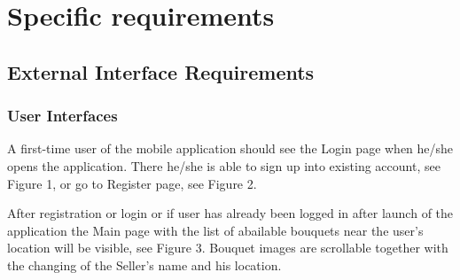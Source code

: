 \documentclass{scrreprt}
\begin{document}
\chapter{Specific requirements}
\section{External Interface Requirements}

\subsection{User Interfaces}
A first-time user of the mobile application should see the Login page when he/she opens the application. There he/she is able to sign up into existing account, see Figure 1, or go to Register page, see Figure 2.

After registration or login or if user has already been logged in after launch of the application the Main page with the list of abailable bouquets near the user's location will be visible, see Figure 3. Bouquet images are scrollable together with the changing of the Seller's name and his location.
\end{document}

